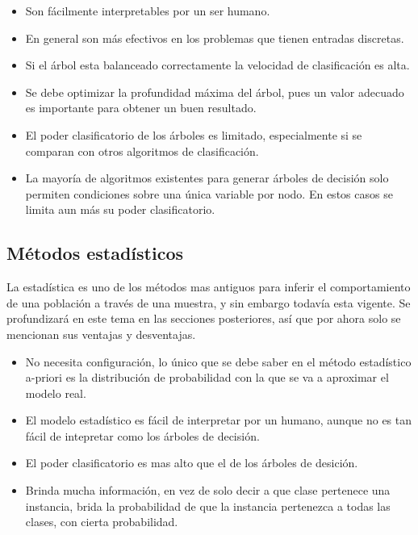 \documentclass[a4paper, 11pt, oneside]{report}
\begin{document}
	\begin{itemize}
	
	\item Son fácilmente interpretables por un ser humano.

	\item En general son más efectivos en los problemas que tienen entradas discretas.
	
	\item Si el árbol esta balanceado correctamente la velocidad de clasificación es alta.
	
	\item Se debe optimizar la profundidad máxima del árbol, pues un valor adecuado es importante para obtener un buen resultado.
	
	\item El poder clasificatorio de los árboles es limitado, especialmente si se comparan con otros algoritmos de clasificación.
	
	\item La mayoría de algoritmos existentes para generar árboles de decisión solo permiten condiciones sobre una única variable por nodo. En estos casos se limita aun más su poder clasificatorio. 

	\end{itemize}

\subsection{Métodos estadísticos}

La estadística es uno de los métodos mas antiguos para inferir el comportamiento de una población a través de una muestra, y sin embargo todavía esta vigente. Se profundizará en este tema en las secciones posteriores, así que por ahora solo se mencionan sus ventajas y desventajas.

	\begin{itemize}

	\item No necesita configuración, lo único que se debe saber en el método estadístico a-priori es la distribución de probabilidad con la que se va a  aproximar el modelo real.

	\item El modelo estadístico es fácil de interpretar por un humano, aunque no es tan fácil de intepretar como los árboles de decisión.

	\item El poder clasificatorio es mas alto que el de los árboles de desición.

	\item Brinda mucha información, en vez de solo decir a que clase pertenece una instancia, brida la probabilidad de que la instancia pertenezca a todas las clases, con cierta probabilidad.
	
	\end{itemize}
	
\end{document}
